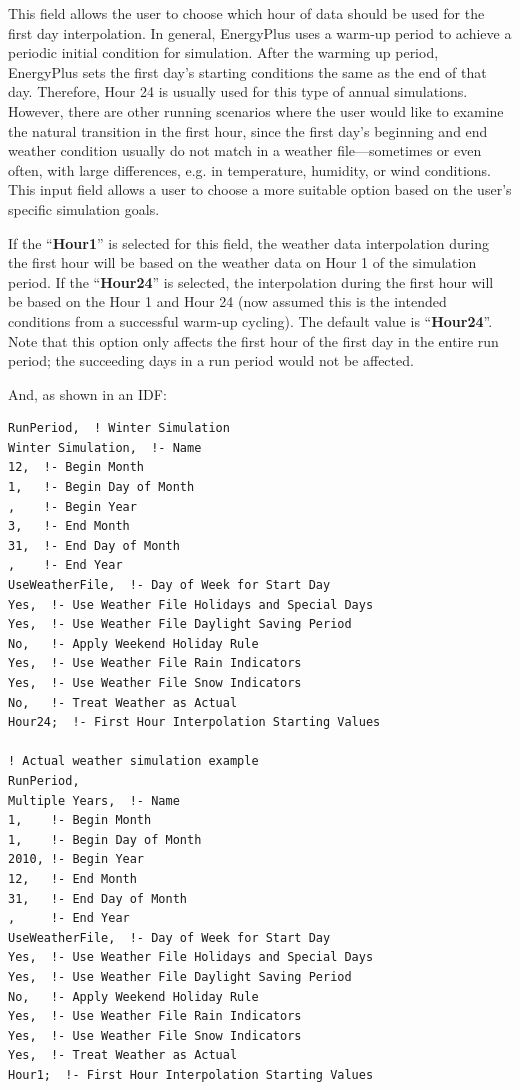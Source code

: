 This field allows the user to choose which hour of data should be used for the first day interpolation. In general, EnergyPlus uses a warm-up period to achieve a periodic initial condition for simulation. After the warming up period, EnergyPlus sets the first day's starting conditions the same as the end of that day. Therefore, Hour 24 is usually used for this type of annual simulations. However, there are other running scenarios where the user would like to examine the natural transition in the first hour, since the first day's beginning and end weather condition usually do not match in a weather file---sometimes or even often, with large differences, e.g. in temperature, humidity, or wind conditions. This input field allows a user to choose a more suitable option based on the user's specific simulation goals.

If the ``\textbf{Hour1}'' is selected for this field, the weather data interpolation during the first hour will be based on the weather data on Hour 1 of the simulation period. If the ``\textbf{Hour24}'' is selected, the interpolation during the first hour will be based on the Hour 1 and Hour 24 (now assumed this is the intended conditions from a successful warm-up cycling). The default value is ``\textbf{Hour24}''. Note that this option only affects the first hour of the first day in the entire run period; the succeeding days in a run period would not be affected.

And, as shown in an IDF:

\begin{lstlisting}
RunPeriod,  ! Winter Simulation
Winter Simulation,  !- Name
12,  !- Begin Month
1,   !- Begin Day of Month
,    !- Begin Year
3,   !- End Month
31,  !- End Day of Month
,    !- End Year
UseWeatherFile,  !- Day of Week for Start Day
Yes,  !- Use Weather File Holidays and Special Days
Yes,  !- Use Weather File Daylight Saving Period
No,   !- Apply Weekend Holiday Rule
Yes,  !- Use Weather File Rain Indicators
Yes,  !- Use Weather File Snow Indicators
No,   !- Treat Weather as Actual
Hour24;  !- First Hour Interpolation Starting Values

! Actual weather simulation example
RunPeriod,
Multiple Years,  !- Name
1,    !- Begin Month
1,    !- Begin Day of Month
2010, !- Begin Year
12,   !- End Month
31,   !- End Day of Month
,     !- End Year
UseWeatherFile,  !- Day of Week for Start Day
Yes,  !- Use Weather File Holidays and Special Days
Yes,  !- Use Weather File Daylight Saving Period
No,   !- Apply Weekend Holiday Rule
Yes,  !- Use Weather File Rain Indicators
Yes,  !- Use Weather File Snow Indicators
Yes,  !- Treat Weather as Actual
Hour1;  !- First Hour Interpolation Starting Values
\end{lstlisting}

